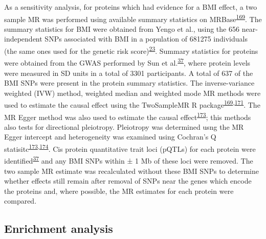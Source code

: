 \documentclass[11pt,twoside]{bristolthesis}
\begin{document}
As a sensitivity analysis, for proteins which had evidence for a BMI effect, a two sample MR was performed using available summary statistics on MRBase\textsuperscript{\protect\hyperlink{ref-Hemani2018}{169}}. The summary statistics for BMI were obtained from Yengo et al., using the 656 near-independent SNPs associated with BMI in a population of 681275 individuals (the same ones used for the genetic risk score)\textsuperscript{\protect\hyperlink{ref-Yengo2018}{23}}. Summary statistics for proteins were obtained from the GWAS performed by Sun et al.\textsuperscript{\protect\hyperlink{ref-Sun2018}{37}}, where protein levels were measured in SD units in a total of 3301 participants. A total of 637 of the BMI SNPs were present in the protein summary statistics. The inverse-variance weighted (IVW) method, weighted median and weighted mode MR methods were used to estimate the causal effect using the TwoSampleMR R package\textsuperscript{\protect\hyperlink{ref-Hemani2018}{169},\protect\hyperlink{ref-Burgess2016}{171}}. The MR Egger method was also used to estimate the causal effect\textsuperscript{\protect\hyperlink{ref-Burgess2017}{173}}; this methods also tests for directional pleiotropy. Pleiotropy was determined usng the MR Egger intercept and heterogeneity was examined using Cochran's Q statisitc\textsuperscript{\protect\hyperlink{ref-Burgess2017}{173},\protect\hyperlink{ref-Greco2015}{174}}. Cis protein quantitative trait loci (pQTLs) for each protein were identified\textsuperscript{\protect\hyperlink{ref-Sun2018}{37}} and any BMI SNPs within ± 1 Mb of these loci were removed. The two sample MR estimate was recalculated without these BMI SNPs to determine whether effects still remain after removal of SNPs near the genes which encode the proteins and, where possible, the MR estimates for each protein were compared.

\hypertarget{enrichment-analysis}{%
\subsection{Enrichment analysis}\label{enrichment-analysis}}
\end{document}
